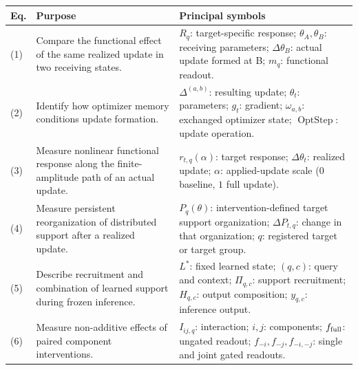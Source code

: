 \documentclass[12pt,letterpaper]{article}
\begin{document}
\endgroup
\newpage
\begin{center}
\begin{minipage}{\textwidth}
\captionsetup{justification=raggedright,singlelinecheck=false,skip=7pt}
\label{tab:equation_guide}
\begingroup
\footnotesize\linespread{1.02}\selectfont
\setlength{\tabcolsep}{4pt}
\renewcommand{\arraystretch}{1.20}
\begin{tabular}{@{}p{0.41in}>{\raggedright\arraybackslash}p{2.15in}>{\raggedright\arraybackslash}p{3.64in}@{}}
\toprule
\textbf{Eq.} & \textbf{Purpose} & \textbf{Principal symbols}\\
\midrule
(1) & Compare the functional effect of the same realized update in two receiving states. & $R_q$: target-specific response; $\theta_A,\theta_B$: receiving parameters; $\Delta\theta_B$: actual update formed at B; $m_q$: functional readout.\\
\addlinespace[3pt]
(2) & Identify how optimizer memory conditions update formation. & $\Delta^{(a,b)}$: resulting update; $\theta_t$: parameters; $g_t$: gradient; $\omega_{a,b}$: exchanged optimizer state; $\operatorname{OptStep}$: update operation.\\
\addlinespace[3pt]
(3) & Measure nonlinear functional response along the finite-amplitude path of an actual update. & $r_{t,q}(\alpha)$: target response; $\Delta\theta_t$: realized update; $\alpha$: applied-update scale ($0$ baseline, $1$ full update).\\
\addlinespace[3pt]
(4) & Measure persistent reorganization of distributed support after a realized update. & $P_q(\theta)$: intervention-defined target support organization; $\Delta P_{t,q}$: change in that organization; $q$: registered target or target group.\\
\addlinespace[3pt]
(5) & Describe recruitment and combination of learned support during frozen inference. & $L^*$: fixed learned state; $(q,c)$: query and context; $\Pi_{q,c}$: support recruitment; $H_{q,c}$: output composition; $y_{q,c}$: inference output.\\
\addlinespace[3pt]
(6) & Measure non-additive effects of paired component interventions. & $I_{ij,q}$: interaction; $i,j$: components; $f_{\rm full}$: ungated readout; $f_{-i},f_{-j},f_{-i,-j}$: single and joint gated readouts.\\

\end{tabular}
\end{minipage}
\end{center}
\end{document}

